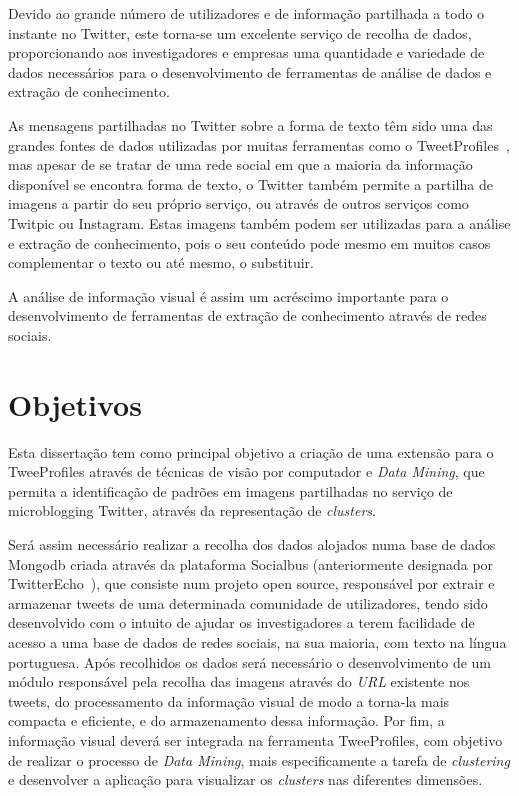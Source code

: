 Devido ao grande número de utilizadores e de informação partilhada a todo o instante no Twitter, este torna-se um excelente serviço de recolha de dados, proporcionando aos investigadores e empresas uma quantidade e variedade de dados necessários para o desenvolvimento de ferramentas de análise de dados e extração de conhecimento.

As mensagens partilhadas no Twitter sobre a forma de texto têm sido uma das grandes fontes de dados utilizadas por muitas ferramentas como o TweetProfiles~\citet{Cunha2013}, mas apesar de se tratar de uma rede social em que a maioria da informação disponível se encontra forma de texto, o Twitter também permite a partilha de imagens a partir do seu próprio serviço, ou através de outros serviços como Twitpic ou Instagram. Estas imagens também podem ser utilizadas para a análise e extração de conhecimento, pois o seu conteúdo pode mesmo em muitos casos complementar o texto ou até mesmo, o substituir.

A análise de informação visual é assim um acréscimo importante para o desenvolvimento de ferramentas de extração de conhecimento através de redes sociais. 

\section{Objetivos} \label{sec:object}

Esta dissertação tem como principal objetivo a criação de uma extensão para o TweeProfiles através de técnicas de visão por computador e \textit{Data Mining}, que permita a identificação de padrões em imagens partilhadas no serviço de microblogging Twitter, através da representação de \textit{clusters}.

Será assim necessário realizar a recolha dos dados alojados numa base de dados Mongodb criada através da plataforma Socialbus (anteriormente designada por TwitterEcho~\cite{Boanjak2012}), que consiste num projeto open source, responsável por extrair e armazenar tweets de uma determinada comunidade de utilizadores, tendo sido desenvolvido com o intuito de ajudar os investigadores a terem facilidade de acesso a uma base de dados de redes sociais, na sua maioria, com texto na língua portuguesa. Após recolhidos os dados será necessário o desenvolvimento de um módulo responsável pela recolha das imagens através do \textit{URL} existente nos tweets, do processamento da informação visual de modo a torna-la mais compacta e eficiente, e do armazenamento dessa informação. Por fim, a informação visual deverá ser integrada na ferramenta TweeProfiles, com objetivo de realizar o processo de \textit{Data Mining}, mais especificamente a tarefa de \textit{clustering} e desenvolver a aplicação para visualizar os \textit{clusters} nas diferentes dimensões. 

